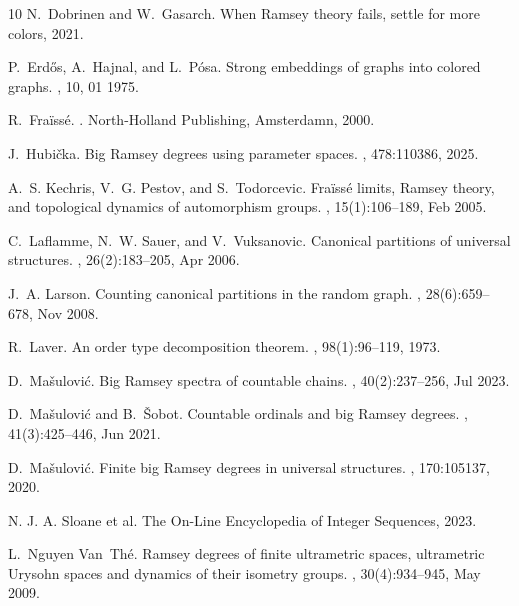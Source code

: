 \documentclass[10pt,a4paper]{article}
\theoremstyle{plain}
\theoremstyle{definition}
\begin{document}
\begin{thebibliography}{10}
N.~Dobrinen and W.~Gasarch.
\newblock When {R}amsey theory fails, settle for more colors, 2021.

P.~Erdős, A.~Hajnal, and L.~Pósa.
\newblock Strong embeddings of graphs into colored graphs.
, 10, 01 1975.

R.~{Fra\"{i}ss\'{e}}.
.
\newblock North-Holland Publishing, Amsterdamn, 2000.

J.~Hubička.
\newblock Big {R}amsey degrees using parameter spaces.
, 478:110386, 2025.

A.~S. Kechris, V.~G. Pestov, and S.~Todorcevic.
\newblock Fra{\"i}ss{\'e} limits, {R}amsey theory, and topological dynamics of
  automorphism groups.
, 15(1):106--189, Feb
  2005.

C.~Laflamme, N.~W. Sauer, and V.~Vuksanovic.
\newblock Canonical partitions of universal structures.
, 26(2):183--205, Apr 2006.

J.~A. Larson.
\newblock Counting canonical partitions in the random graph.
, 28(6):659--678, Nov 2008.

R.~Laver.
\newblock An order type decomposition theorem.
, 98(1):96--119, 1973.

D.~Ma{\v{s}}ulovi{\'{c}}.
\newblock Big {R}amsey spectra of countable chains.
, 40(2):237--256, Jul 2023.

D.~Ma{\v{s}}ulovi{\'{c}} and B.~{\v{S}}obot.
\newblock Countable ordinals and big {R}amsey degrees.
, 41(3):425--446, Jun 2021.

D.~Mašulović.
\newblock Finite big {R}amsey degrees in universal structures.
, 170:105137, 2020.

{N. J. A. Sloane et al.}
\newblock The {On-Line Encyclopedia of Integer Sequences}, 2023.

L.~Nguyen Van~Th\'e.
\newblock Ramsey degrees of finite ultrametric spaces, ultrametric {U}rysohn
  spaces and dynamics of their isometry groups.
, 30(4):934–945, May 2009.


\end{thebibliography}
\end{document}

